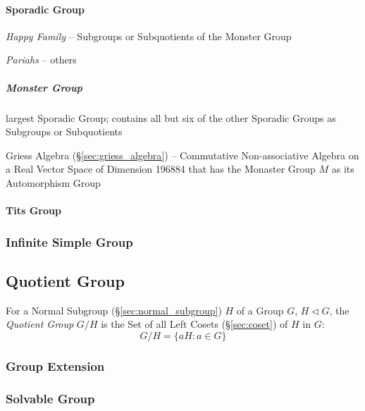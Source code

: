 \paragraph{Sporadic Group}\label{sec:sporadic_group}\hfill

\emph{Happy Family} -- Subgroups or Subquotients of the Monster Group

\emph{Pariahs} -- others



\subparagraph{Monster Group}\label{sec:monster_group}\hfill

largest Sporadic Group; contains all but six of the other Sporadic Groups as
Subgroups or Subquotients

Griess Algebra (\S\ref{sec:griess_algebra}) -- Commutative Non-associative
Algebra on a Real Vector Space of Dimension 196884 that has the Monaster Group
$M$ as its Automorphism Group



\paragraph{Tits Group}\label{sec:tits_group}\hfill



\subsubsection{Infinite Simple Group}\label{sec:infinite_simple_group}



\subsection{Quotient Group}\label{sec:quotient_group}

For a Normal Subgroup (\S\ref{sec:normal_subgroup}) $H$ of a Group
$G$, $H \triangleleft G$, the \emph{Quotient Group} $G/H$ is the Set
of all Left Cosets (\S\ref{sec:coset}) of $H$ in $G$:
\[
    G/H = \{ aH : a \in G \}
\]



\subsubsection{Group Extension}\label{sec:group_extension}

\subsubsection{Solvable Group}\label{sec:solvable_group}

